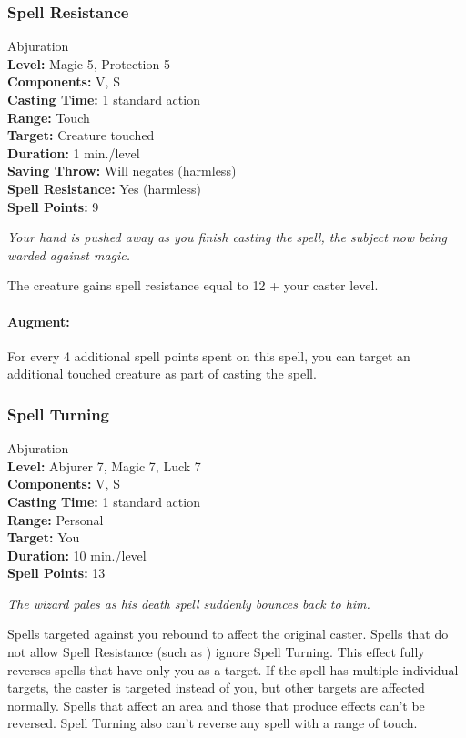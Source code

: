 \subsubsection{Spell Resistance}
\label{Spell:SpellResistance}
Abjuration
\\ \textbf{Level:} Magic 5, Protection 5
\\ \textbf{Components:} V, S
\\ \textbf{Casting Time:} 1 standard action
\\ \textbf{Range:} Touch
\\ \textbf{Target:} Creature touched
\\ \textbf{Duration:} 1 min./level
\\ \textbf{Saving Throw:} Will negates (harmless)
\\ \textbf{Spell Resistance:} Yes (harmless)
\\ \textbf{Spell Points:} 9

\emph{Your hand is pushed away as you finish casting the spell, the subject now being warded against magic.}

The creature gains spell resistance equal to 12 + your caster level.

\paragraph{Augment:} For every 4 additional spell points spent on this spell, you can target an additional touched creature as part of casting the spell.
\subsubsection{Spell Turning}
\label{Spell:SpellTurning}
Abjuration
\\ \textbf{Level:} Abjurer 7, Magic 7, Luck 7
\\ \textbf{Components:} V, S
\\ \textbf{Casting Time:} 1 standard action
\\ \textbf{Range:} Personal
\\ \textbf{Target:} You
\\ \textbf{Duration:} 10 min./level
\\ \textbf{Spell Points:} 13

\emph{The wizard pales as his death spell suddenly bounces back to him.}

Spells targeted against you rebound to affect the original caster.
Spells that do not allow Spell Resistance (such as ) ignore Spell Turning. 
This effect fully reverses spells that have only you as a target.
If the spell has multiple individual targets, the caster is targeted instead of you, 
but other targets are affected normally.
Spells that affect an area and those that produce effects can't be reversed. 
Spell Turning also can't reverse any spell with a range of touch. 


